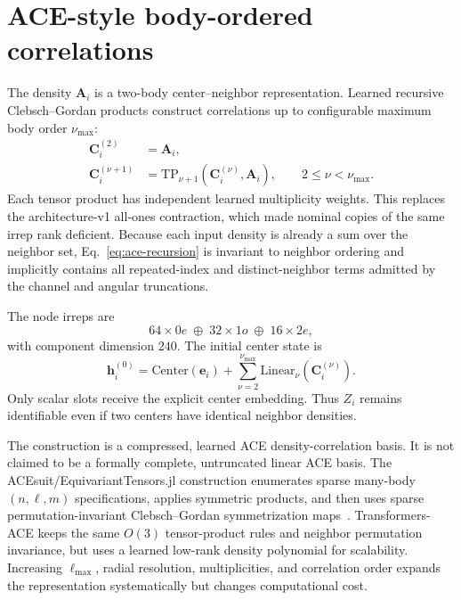 \documentclass[10pt]{article}
\newcommand{\vect}[1]{\bm{#1}}
\begin{document}
\section{ACE-style body-ordered correlations}

The density $\vect A_i$ is a two-body center--neighbor representation. Learned
recursive Clebsch--Gordan products construct correlations up to configurable
maximum body order $\nu_{\max}$:
\begin{align}
 \vect C_i^{(2)} &= \vect A_i,\\
 \vect C_i^{(\nu+1)} &= \mathrm{TP}_{\nu+1}(\vect C_i^{(\nu)},\vect A_i),
 \qquad 2\leq\nu<\nu_{\max}.
 \label{eq:ace-recursion}
\end{align}
Each tensor product has independent learned multiplicity weights. This replaces
the architecture-v1 all-ones contraction, which made nominal copies of the same
irrep rank deficient. Because each input density is already a sum over the
neighbor set, Eq.~\eqref{eq:ace-recursion} is invariant to neighbor ordering and
implicitly contains all repeated-index and distinct-neighbor terms admitted by
the channel and angular truncations.

The node irreps are
\begin{equation}
 64\times0e\;\oplus\;32\times1o\;\oplus\;16\times2e,
 \label{eq:node-irreps}
\end{equation}
with component dimension $240$. The initial center state is
\begin{equation}
 \vect h_i^{(0)}=
 \mathrm{Center}(\vect e_i)
 +\sum_{\nu=2}^{\nu_{\max}}\mathrm{Linear}_{\nu}(\vect C_i^{(\nu)}).
 \label{eq:center-state}
\end{equation}
Only scalar slots receive the explicit center embedding. Thus $Z_i$ remains
identifiable even if two centers have identical neighbor densities.

The construction is a compressed, learned ACE density-correlation basis. It is
not claimed to be a formally complete, untruncated linear ACE basis. The
ACEsuit/EquivariantTensors.jl construction enumerates sparse many-body
$(n,\ell,m)$ specifications, applies symmetric products, and then uses sparse
permutation-invariant Clebsch--Gordan symmetrization maps~\cite{equivarianttensors}.
Transformers-ACE keeps the same $O(3)$ tensor-product rules and neighbor
permutation invariance, but uses a learned low-rank density polynomial for
scalability. Increasing $\ell_{\max}$, radial resolution, multiplicities, and
correlation order expands the representation systematically but changes
computational cost.
\end{document}
